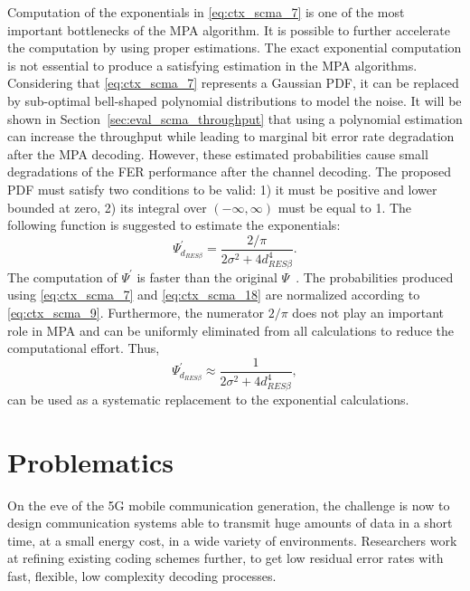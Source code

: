 Computation of the exponentials in \eqref{eq:ctx_scma_7} is one of the most
important bottlenecks of the MPA algorithm. It is possible to further accelerate
the computation by using proper estimations. The exact exponential computation
is not essential to produce a satisfying estimation in the MPA algorithms.
Considering that \eqref{eq:ctx_scma_7} represents a Gaussian PDF, it can be
replaced by sub-optimal bell-shaped polynomial distributions to model the noise.
It will be shown in Section~\ref{sec:eval_scma_throughput} that using a
polynomial estimation can increase the throughput while leading to marginal bit
error rate degradation after the MPA decoding. However, these estimated
probabilities cause small degradations of the FER performance after the channel
decoding. The proposed PDF must satisfy two conditions to be valid: 1) it must
be positive and lower bounded at zero, 2) its integral over $(-\infty, \infty)$
must be equal to 1. The following function is suggested to estimate the
exponentials:
\begin{equation}
  \label{eq:ctx_scma_18}
  \Psi^{'}_{d_{RES \beta}} = \frac{2 / \pi}{2\sigma^2 + 4d^4_{RES \beta}}.
\end{equation}
The computation of $\Psi^{'}$ is faster than the original
$\Psi$~\cite{Ghaffari2017,Ghaffari2019}. The probabilities produced using
\eqref{eq:ctx_scma_7} and \eqref{eq:ctx_scma_18} are normalized according to
\eqref{eq:ctx_scma_9}. Furthermore, the numerator $2/\pi$ does not play an
important role in MPA and can be uniformly eliminated from all calculations to
reduce the computational effort. Thus,
\begin{equation}
  \label{eq:ctx_scma_19}
  \Psi^{'}_{d_{RES \beta}} \approx \frac{1}{2\sigma^2 + 4d^4_{RES \beta}},
\end{equation}
can be used as a systematic replacement to the exponential calculations.

\section{Problematics}
\label{sec:ctx_problematics}

On the eve of the 5G mobile communication generation, the challenge is now to
design communication systems able to transmit huge amounts of data in a short
time, at a small energy cost, in a wide variety of environments. Researchers
work at refining existing coding schemes further, to get low residual error
rates with fast, flexible, low complexity decoding processes.

